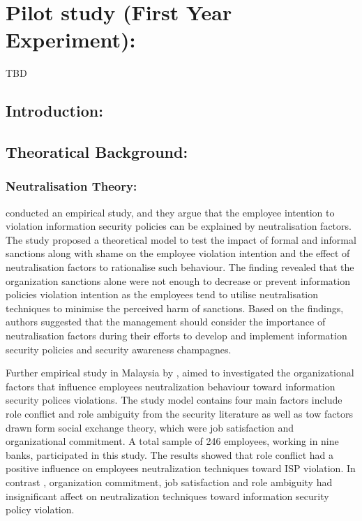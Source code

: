 
\section{Pilot study (First Year Experiment):}
TBD
\subsection{Introduction:}
  

\subsection{Theoratical Background:}
\subsubsection{Neutralisation Theory:}

\citet{Siponen2010}conducted an empirical study, and they argue that the employee intention to violation information security policies can be explained by neutralisation factors. The study proposed a theoretical model to test the impact of formal and informal sanctions along with shame on the employee violation intention and the effect of neutralisation factors to rationalise such behaviour. The finding revealed that the organization sanctions alone were not enough to decrease or prevent information policies violation intention as the employees tend to utilise neutralisation techniques to minimise the perceived harm of sanctions. Based on the findings,  authors suggested that the management should consider the importance of neutralisation factors during their efforts to develop and implement information security policies and security awareness champagnes.      

Further empirical study in Malaysia by \citet{Teh2015}, aimed to investigated the organizational factors that influence employees neutralization behaviour toward information security polices violations. The study model contains four main  factors include role conflict and role ambiguity from the security literature as well as tow factors drawn form social exchange theory, which were job satisfaction and organizational commitment. A total sample of 246 employees, working in nine banks, participated in this study. The results showed that role conflict had a positive influence on employees neutralization techniques toward ISP violation. In contrast , organization commitment, job satisfaction and role ambiguity had insignificant affect on neutralization techniques toward information security policy violation. 

